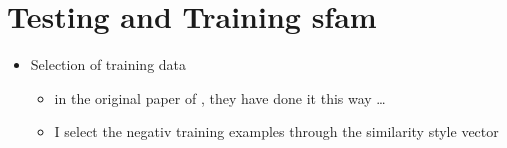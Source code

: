 \section{Testing and Training \acs{sfam}}
\label{sec:approach:sfam}

\begin{itemize}
  \item Selection of training data
        \begin{itemize}
          \item in the original paper of \textcite{patelLearningInterpretableStyle2023}, they have done it this way \ldots
          \item I select the negativ training examples through the similarity style vector
        \end{itemize}
\end{itemize}